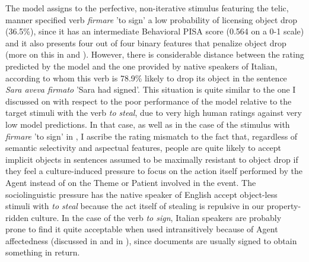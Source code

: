 The model assigns to the perfective, non-iterative stimulus featuring the telic, manner specified verb \textit{firmare} 'to sign' a low probability of licensing object drop (36.5\%), since it has an intermediate Behavioral PISA score (0.564 on a 0-1 scale) and it also presents four out of four binary features that penalize object drop (more on this in  and ). However, there is considerable distance between the rating predicted by the model and the one provided by native speakers of Italian, according to whom this verb is 78.9\% likely to drop its object in the sentence \textit{Sara aveva firmato} 'Sara had signed'. This situation is quite similar to the one I discussed on  with respect to the poor performance of the model relative to the target stimuli with the verb \textit{to steal}, due to very high human ratings against very low model predictions. In that case, as well as in the case of the stimulus with \textit{firmare} 'to sign' in , I ascribe the rating mismatch to the fact that, regardless of semantic selectivity and aspectual features, people are quite likely to accept implicit objects in sentences assumed to be maximally resistant to object drop if they feel a culture-induced pressure to focus on the action itself performed by the Agent instead of on the Theme or Patient involved in the event. The sociolinguistic pressure has the native speaker of English accept object-less stimuli with \textit{to steal} because the act itself of stealing is repulsive in our property-ridden culture. In the case of the verb \textit{to sign}, Italian speakers are probably prone to find it quite acceptable when used intransitively because of Agent affectedness (discussed in  and in ), since documents are usually signed to obtain something in return.\\ %
